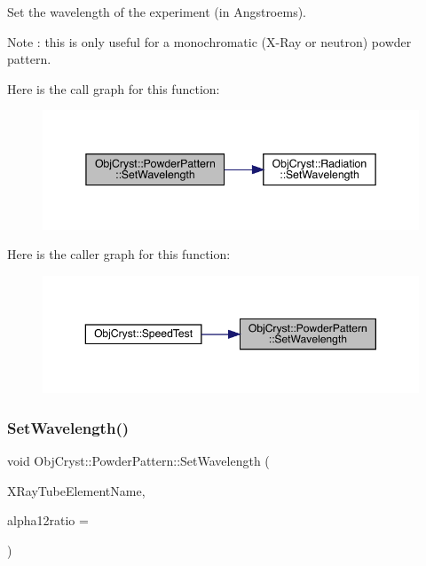 Set the wavelength of the experiment (in Angstroems).

\begin{DoxyNote}{Note}
\+: this is only useful for a monochromatic (X-\/\+Ray or neutron) powder pattern. 
\end{DoxyNote}
Here is the call graph for this function\+:
\nopagebreak
\begin{figure}[H]
\begin{center}
\leavevmode
\includegraphics[width=345pt]{class_obj_cryst_1_1_powder_pattern_aea1c5351f710f2a91844b0f29b7b04aa_cgraph}
\end{center}
\end{figure}
Here is the caller graph for this function\+:
\nopagebreak
\begin{figure}[H]
\begin{center}
\leavevmode
\includegraphics[width=350pt]{class_obj_cryst_1_1_powder_pattern_aea1c5351f710f2a91844b0f29b7b04aa_icgraph}
\end{center}
\end{figure}
\mbox{\label{class_obj_cryst_1_1_powder_pattern_a9638b42f38dd82522593e1e01b6629c6}} 
\subsubsection{\texorpdfstring{SetWavelength()}{SetWavelength()}\hspace{0.1cm}{\footnotesize\ttfamily [2/2]}}
{\footnotesize\ttfamily void Obj\+Cryst\+::\+Powder\+Pattern\+::\+Set\+Wavelength (\begin{DoxyParamCaption}\item[{const string \&}]{X\+Ray\+Tube\+Element\+Name,  }\item[{const R\+E\+AL}]{alpha12ratio = {} }\end{DoxyParamCaption})}



